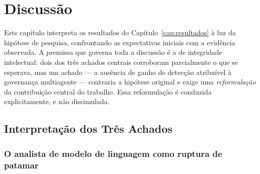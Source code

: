 
\chapter{Discussão}
\label{cap:discussao}

Este capítulo interpreta os resultados do Capítulo~\ref{cap:resultados} à luz da
hipótese de pesquisa, confrontando as expectativas iniciais com a evidência
observada. A premissa que governa toda a discussão é a de integridade
intelectual: dois dos três achados centrais corroboram parcialmente o que se
esperava, mas um achado --- a ausência de ganho de detecção atribuível à
governança multiagente --- contraria a hipótese original e exige uma
\emph{reformulação} da contribuição central do trabalho. Essa reformulação é
conduzida explicitamente, e não dissimulada.

\section{Interpretação dos Três Achados}
\label{sec:disc-interpretacao}

\subsection{O analista de modelo de linguagem como ruptura de patamar}
\label{subsec:disc-llm-siem}


